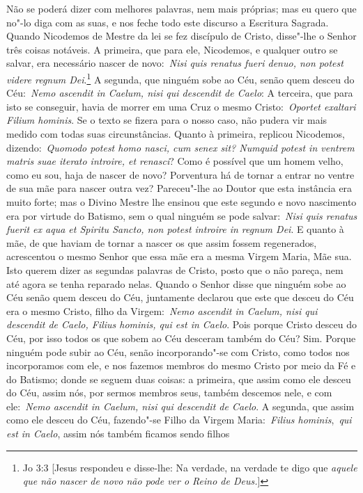Não se poderá dizer com melhores palavras, nem mais
próprias; mas eu quero que no"-lo diga com as suas, e nos feche todo este
discurso a Escritura Sagrada. Quando Nicodemos de Mestre da lei se fez
discípulo de Cristo, disse"-lhe o Senhor três coisas notáveis. A
primeira, que para ele, Nicodemos, e qualquer outro se salvar, era
necessário nascer de novo:~\emph{Nisi quis renatus fueri denuo, non
potest videre regnum Dei}.\footnote{Jo 3:3 [Jesus respondeu e disse-lhe: Na verdade, na verdade te digo que \textit{aquele que não nascer de novo não pode ver o Reino de Deus.}]} A segunda, que ninguém sobe
ao Céu, senão quem desceu do Céu:~\emph{Nemo ascendit in Caelum, nisi
qui descendit de Caelo}: A terceira, que para isto se
conseguir, havia de morrer em uma Cruz o mesmo Cristo:~\emph{Oportet
exaltari Filium hominis}. Se o texto se fizera para o
nosso caso, não pudera vir mais medido com todas suas circunstâncias.
Quanto à primeira, replicou Nicodemos, dizendo:~\emph{Quomodo potest
homo nasci, cum senex sit? Numquid potest in ventrem matris suae iterato
introire, et renasci}? Como é possível que um homem velho, como eu sou,
haja de nascer de novo? Porventura há de tornar a entrar no ventre de
sua mãe para nascer outra vez? Pareceu"-lhe ao Doutor que esta instância
era muito forte; mas o Divino Mestre lhe ensinou que este segundo e novo
nascimento era por virtude do Batismo, sem o qual ninguém se pode
salvar:~\emph{Nisi quis renatus fuerit ex aqua et Spiritu Sancto, non
potest introire in regnum Dei}. E quanto à mãe, de que haviam de tornar
a nascer os que assim fossem regenerados, acrescentou o mesmo Senhor que
essa mãe era a mesma Virgem Maria, Mãe sua. Isto querem dizer as
segundas palavras de Cristo, posto que o não pareça, nem até agora se
tenha reparado nelas. Quando o Senhor disse que ninguém sobe ao Céu
senão quem desceu do Céu, juntamente declarou que este que desceu do Céu
era o mesmo Cristo, filho da Virgem:~\emph{Nemo ascendit in Caelum, nisi
qui descendit de Caelo, Filius hominis, qui est in Caelo}. Pois porque
Cristo desceu do Céu, por isso todos os que sobem ao Céu desceram também
do Céu? Sim. Porque ninguém pode subir ao Céu, senão incorporando"-se com
Cristo, como todos nos incorporamos com ele, e nos fazemos membros do
mesmo Cristo por meio da Fé e do Batismo; donde se seguem duas coisas: a
primeira, que assim como ele desceu do Céu, assim nós, por sermos
membros seus, também descemos nele, e com ele:~\emph{Nemo ascendit in
Caelum, nisi qui descendit de Caelo}. A segunda, que assim como ele
desceu do Céu, fazendo"-se Filho da Virgem Maria:~\emph{Filius
hominis},~\emph{qui est in Caelo}, assim nós também ficamos sendo filhos
